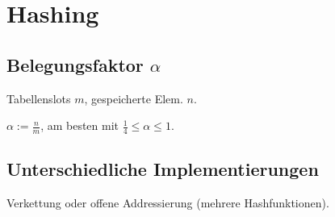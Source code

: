 \section*{Hashing}

\subsection*{Belegungsfaktor $\alpha$}
Tabellenslots $m$, gespeicherte Elem. $n$.

$\alpha := \frac{n}{m}$, am besten mit $\frac{1}{4} \le \alpha \le 1$.

\subsection*{Unterschiedliche Implementierungen}
Verkettung oder offene Addressierung (mehrere Hashfunktionen).

